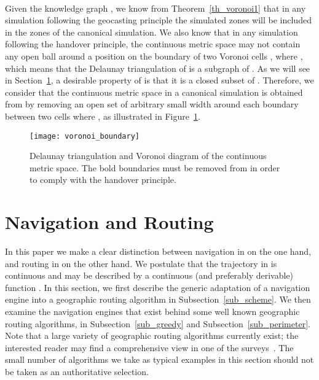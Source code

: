 \documentclass{article}
\begin{document}
\paragraph{}
Given the knowledge graph , we know from Theorem~\ref{th_voronoi1} that in any simulation following the geocasting principle the simulated zones will be included in the zones of the canonical simulation. We also know that in any simulation following the handover principle, the continuous metric space  may not contain any open ball around a position on the boundary of two Voronoi cells ,  where , which means that the Delaunay triangulation of  is a subgraph of .
 As we will see in Section~\ref{sec_navigation}, a desirable property of  is that it is a closed subset of . Therefore, we consider that the continuous metric space  in a canonical simulation is obtained from  by removing an open set of arbitrary small width  around each boundary between two cells  where , as illustrated in Figure~\ref{fig_delaunay}.

\begin{figure}[htb]
\begin{center}
\texttt{[image: voronoi\_boundary]}
\caption{Delaunay triangulation and Voronoi diagram of the continuous metric space. The bold boundaries must be removed from  in order to comply with the handover principle.}
\label{fig_delaunay}
\end{center}
\end{figure}

\section{Navigation and Routing}
\label{sec_navigation}
In this paper we make a clear distinction between navigation in  on the one hand, and routing in  on the other hand. We postulate that the trajectory in  is continuous and may be described by a continuous (and preferably derivable) function .
In this section, we first describe the generic adaptation of a navigation engine into a geographic routing algorithm in Subsection~\ref{sub_scheme}. We then examine the navigation engines that exist behind some well known geographic routing algorithms, in Subsection~\ref{sub_greedy} and Subsection~\ref{sub_perimeter}.
Note that a large variety of geographic routing algorithms currently exist; the interested reader may find a comprehensive view in one of the surveys~\cite{bib_survey1,bib_survey2}. The small number of algorithms we take as typical examples in this section should not be taken as an authoritative selection.
\end{document}
